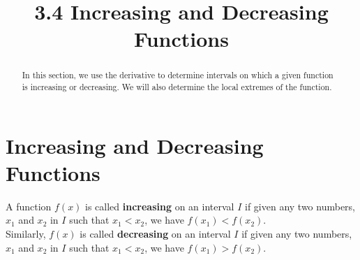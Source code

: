 \documentclass[handout]{ximera}
\title{3.4 Increasing and Decreasing Functions}
\begin{document}
\begin{abstract}
In this section, we use the derivative to determine intervals on which a given function 
is increasing or decreasing.  
We will also determine the local extremes of the function.
\end{abstract}

\maketitle


\section{Increasing and Decreasing Functions}



\begin{definition}
A function $f(x)$ is called \textbf{increasing} on an interval $I$ if given any two 
numbers, $x_1$ and $x_2$ in $I$ such that 
$x_1 < x_2$, we have $f(x_1) < f(x_2)$.\\ 

Similarly, $f(x)$ is called \textbf{decreasing} on an interval $I$ if given any two numbers,
$x_1$ and $x_2$ in $I$ such that 
$x_1 < x_2$, we have $f(x_1) > f(x_2)$. 
\end{definition}




\end{document}
